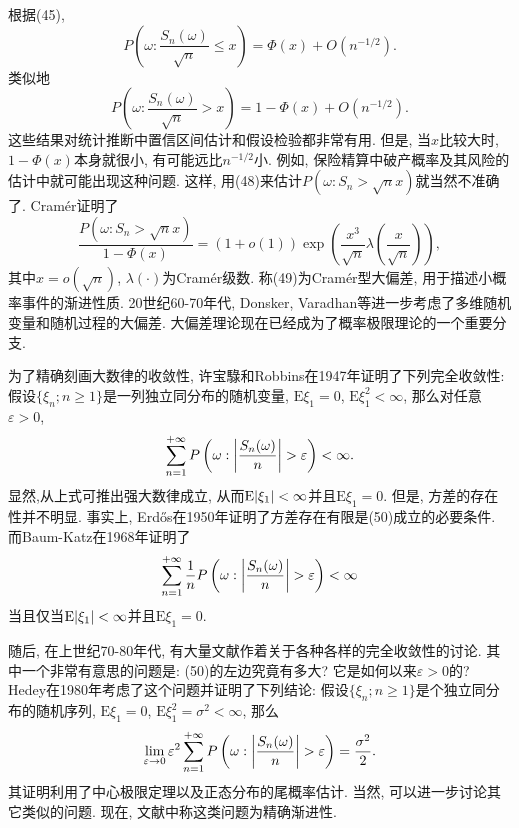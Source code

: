 \documentclass[a4paper,AutoFakeBold,oneside,12pt]{article}
\begin{document}
根据(45),\begin{equation}
    P(\omega:\frac{S_n(\omega)}{\sqrt{n}}\leqslant x) = \Phi(x)+O(n^{-1/2}).
\end{equation}
类似地\begin{equation}
    P(\omega:\frac{S_n(\omega)}{\sqrt{n}}> x) = 1-\Phi(x)+O(n^{-1/2}).
\end{equation}
这些结果对统计推断中置信区间估计和假设检验都非常有用. 但是, 当$x$比较大时, $1-\Phi(x)$本身就很小, 有可能远比$n^{-1/2}$小. 例如, 保险精算中破产概率及其风险的估计中就可能出现这种问题. 这样, 用(48)来估计$P(\omega:S_n>\sqrt{n}x)$就当然不准确了. Cramér证明了\begin{equation}
    \frac{P(\omega:S_n>\sqrt{n}x)}{1-\Phi(x)} = (1+o(1))\exp(\frac{x^3}{\sqrt{n}}\lambda(\frac{x}{\sqrt{n}})),
\end{equation}
其中$x=o(\sqrt{n})$, $\lambda(\cdot)$为Cramér级数. 称(49)为Cramér型大偏差, 用于描述小概率事件的渐进性质. 20世纪60-70年代, Donsker, Varadhan等进一步考虑了多维随机变量和随机过程的大偏差. 大偏差理论现在已经成为了概率极限理论的一个重要分支.

为了精确刻画大数律的收敛性, 许宝騄和Robbins在1947年证明了下列完全收敛性: 假设$\{\xi_n;n\geqslant 1\}$是一列独立同分布的随机变量, $\mathrm{E}\xi_1 = 0$, $\mathrm{E}\xi_1^2<\infty$, 那么对任意$\varepsilon>0$,\begin{equation}
    \sum_{n=1}^{+\infty}P\left( \omega:\abs{\frac{S_n(\omega)}{n}}>\varepsilon \right)<\infty.
\end{equation}
显然,从上式可推出强大数律成立, 从而$\mathrm{E}\abs{\xi_1}<\infty$并且$\mathrm{E}\xi_1 = 0$. 但是, 方差的存在性并不明显. 事实上, Erdős在1950年证明了方差存在有限是(50)成立的必要条件. 而Baum-Katz在1968年证明了\begin{equation}
        \sum_{n=1}^{+\infty}\frac{1}{n}P\left( \omega:\abs{\frac{S_n(\omega)}{n}}>\varepsilon \right)<\infty
\end{equation}
当且仅当$\mathrm{E}\abs{\xi_1}<\infty$并且$\mathrm{E}\xi_1 = 0$.

随后, 在上世纪70-80年代, 有大量文献作着关于各种各样的完全收敛性的讨论. 其中一个非常有意思的问题是: (50)的左边究竟有多大? 它是如何以来$\varepsilon>0$的? Hedey在1980年考虑了这个问题并证明了下列结论: 假设$\{\xi_n;n\geqslant 1\}$是个独立同分布的随机序列, $\mathrm{E}\xi_1=0$, $\mathrm{E}\xi_1^2 = \sigma^2<\infty$, 那么
\begin{equation}
    \lim_{\varepsilon\to 0}\varepsilon^2\sum_{n=1}^{+\infty}P\left( \omega:\abs{\frac{S_n(\omega)}{n}}>\varepsilon \right) = \frac{\sigma^2}{2}.
\end{equation}
其证明利用了中心极限定理以及正态分布的尾概率估计. 当然, 可以进一步讨论其它类似的问题. 现在, 文献中称这类问题为精确渐进性.
\end{document}
